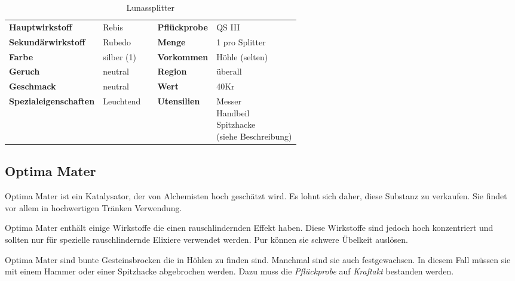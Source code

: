 \begin{table}[h] 
\begin{center} 
\begin{tabular}{|l|l|p{1cm}|l|l|} 
  	\cline{1-2} \cline{4-5} 
  	\textbf{Hauptwirkstoff} & Rebis && \textbf{Pflückprobe} & QS III \\ \cline{1-2} \cline{4-5} 
  	\textbf{Sekundärwirkstoff} & Rubedo && \textbf{Menge} & 1 pro Splitter \\ \cline{1-2} \cline{4-5} 
  	\textbf{Farbe} & silber (1) && \textbf{Vorkommen} & Höhle (selten) \\ \cline{1-2} \cline{4-5} 
  	\textbf{Geruch} & neutral && \textbf{Region} & überall \\ \cline{1-2} \cline{4-5} 
  	\textbf{Geschmack} & neutral && \textbf{Wert} & 40Kr \\ \cline{1-2} \cline{4-5} 
  	\textbf{Spezialeigenschaften} & Leuchtend && \textbf{Utensilien} & \brcell{Messer \\ Handbeil \\ Spitzhacke \\ (siehe Beschreibung)} \\ \cline{1-2} \cline{4-5} 
\end{tabular} 
\end{center} 
\caption{Lunassplitter} 
\label{tab:lunassplitter} 
\end{table}


\subsection{Optima Mater}
Optima Mater ist ein Katalysator, der von Alchemisten hoch geschätzt wird. Es lohnt sich daher, diese Substanz zu verkaufen. Sie findet vor allem in hochwertigen Tränken Verwendung. 

Optima Mater enthält einige Wirkstoffe die einen rauschlindernden Effekt haben. Diese Wirkstoffe sind jedoch hoch konzentriert und sollten nur für spezielle rauschlindernde Elixiere verwendet werden. Pur können sie schwere Übelkeit auslösen.

Optima Mater sind bunte Gesteinsbrocken die in Höhlen zu finden sind. Manchmal sind sie auch festgewachsen. In diesem Fall müssen sie mit einem Hammer oder einer Spitzhacke abgebrochen werden. Dazu muss die \textit{Pflückprobe} auf \textit{Kraftakt} bestanden werden.

